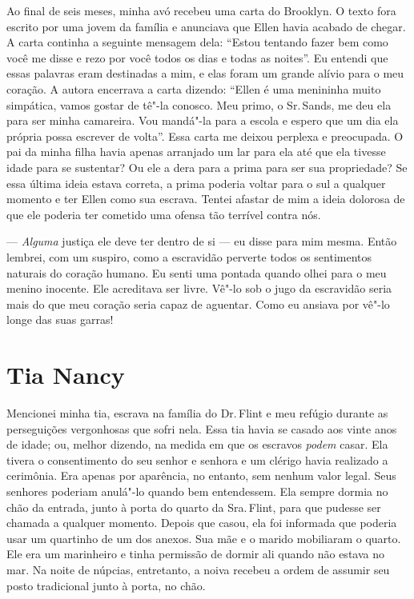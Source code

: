 Ao final de seis meses, minha avó
recebeu uma carta do Brooklyn. O texto fora escrito por uma jovem da
família e anunciava que Ellen havia acabado de chegar. A carta continha
a seguinte mensagem dela: ``Estou tentando fazer bem como você me disse
e rezo por você todos os dias e todas as noites''. Eu entendi que essas
palavras eram destinadas a mim, e elas foram um grande alívio para o meu
coração. A autora encerrava a carta dizendo: ``Ellen é uma menininha
muito simpática, vamos gostar de tê"-la conosco. Meu primo, o Sr.\,Sands,
me deu ela para ser minha camareira. Vou mandá"-la para a escola e espero
que um dia ela própria possa escrever de volta''. Essa carta me deixou
perplexa e preocupada. O pai da minha filha havia apenas arranjado um
lar para ela até que ela tivesse idade para se sustentar? Ou ele a dera
para a prima para ser sua propriedade? Se essa última ideia estava
correta, a prima poderia voltar para o sul a qualquer momento e ter
Ellen como sua escrava. Tentei afastar de mim a ideia dolorosa de que
ele poderia ter cometido uma ofensa tão terrível contra nós.

--- \emph{Alguma} justiça ele deve ter dentro de si --- eu disse para
mim mesma. Então lembrei, com um suspiro, como a escravidão perverte
todos os sentimentos naturais do coração humano. Eu senti uma pontada
quando olhei para o meu menino inocente. Ele acreditava ser livre. Vê"-lo
sob o jugo da escravidão seria mais do que meu coração seria capaz de
aguentar. Como eu ansiava por vê"-lo longe das suas garras!

\chapter*{Tia Nancy}

Mencionei minha tia, escrava na família do Dr.\,Flint e meu refúgio
durante as perseguições vergonhosas que sofri nela. Essa tia havia se
casado aos vinte anos de idade; ou, melhor dizendo, na medida em que os
escravos \emph{podem} casar. Ela tivera o consentimento do seu senhor e
senhora e um clérigo havia realizado a cerimônia. Era apenas por
aparência, no entanto, sem nenhum valor legal. Seus senhores poderiam
anulá"-lo quando bem entendessem. Ela sempre dormia no chão da entrada,
junto à porta do quarto da Sra.\,Flint, para que pudesse ser chamada a
qualquer momento. Depois que casou, ela foi informada que poderia usar
um quartinho de um dos anexos. Sua mãe e o marido mobiliaram o quarto.
Ele era um marinheiro e tinha permissão de dormir ali quando não estava
no mar. Na noite de núpcias, entretanto, a noiva recebeu a ordem de
assumir seu posto tradicional junto à porta, no chão.

